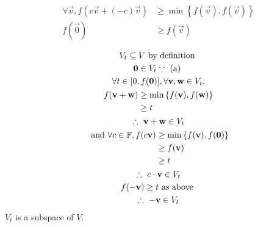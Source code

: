 \documentclass{mathtoolkit}
\begin{document}
\begin{p}
  \item
    \begin{subp}
      \item
        \begin{align*}
          \forall \vec{v},
          f(c \vec{v} + (-c) \vec{v}) & \ge \min \left\{ f(\vec{v}), f(\vec{v}) \right\} \\
          f(\vec{0}) & \ge f(\vec{v})
        \end{align*}
      \item
        \begin{gather*}
          V_t \subseteq V \text{by definition} \\
          \vec{0} \in V_t \because \text{(a)} \\
          \forall t \in [0, f(\vec{0})], \forall \vec{v}, \vec{w} \in V_t, \\
          \begin{aligned}
            f(\vec{v} + \vec{w}) & \ge \min \left\{ f(\vec{v}), f(\vec{w}) \right\} \\
                                 & \ge t
          \end{aligned} \\
          \therefore \vec{v} + \vec{w} \in V_t \\
          \begin{aligned}
            \text{and} \forall c \in \field{F},
            f(c\vec{v}) & \ge \min \left\{ f(\vec{v}), f(\vec{0}) \right\} \\
                        & \ge f(\vec{v}) \\
                        & \ge t
          \end{aligned} \\
          \therefore c \cdot \vec{v} \in V_t \\
          f(- \vec{v}) \ge t \text{as above} \\
          \therefore - \vec{v} \in V_t
        \end{gather*}
        \therefore $V_t$ is a subspace of $V$.
    \end{subp}


\end{p}
\end{document}

